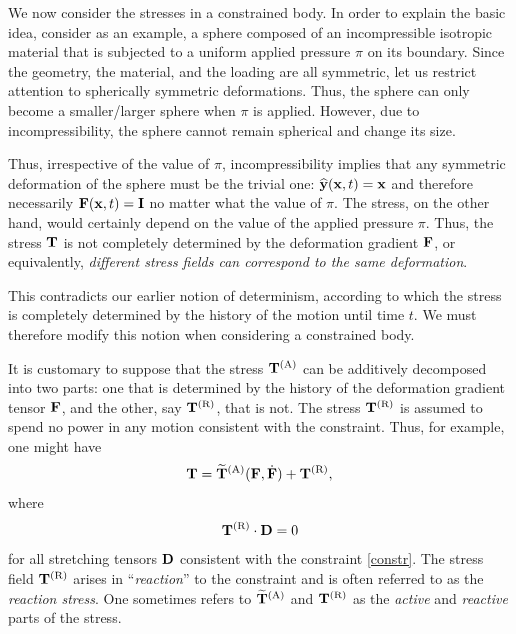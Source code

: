 We now consider the stresses in a constrained body. In order to explain the basic idea, consider as an example, a sphere composed of an incompressible isotropic material that is subjected to a uniform applied pressure $\pi$ on its boundary. Since the geometry, the material, and the loading are all symmetric, let us restrict attention to spherically symmetric deformations. Thus, the sphere can only become a smaller/larger sphere when $\pi$ is applied. However, due to incompressibility, the sphere cannot remain spherical and change its size.

Thus, irrespective of the value of $\pi$, incompressibility implies that any symmetric deformation of the sphere must be the trivial one: $\widehat{\mathbf{y}}(\mathbf{x}, t) = \mathbf{x}$ and therefore necessarily $\mathbf{F}(\mathbf{x}, t) = \mathbf{I}$ no matter what the value of $\pi$. The stress, on the other hand, would certainly depend on the value of the applied pressure $\pi$. Thus, the stress $\mathbf{T}$ is not completely determined by the deformation gradient $\mathbf{F}$, or equivalently,\textit{ different stress fields can correspond to the same deformation}. 

This contradicts our earlier notion of determinism, according to which the stress is completely determined by the history of the motion until time $t$. We must therefore modify this notion when considering a constrained body.

It is customary to suppose that the stress $\mathbf{T}^{(\rm A)}$ can be additively decomposed into two parts: one that is determined by the history of the deformation gradient tensor $\mathbf{F}$, and the other, say $\mathbf{T}^{(\rm R)}$, that is not. The stress $\mathbf{T}^{(\rm R)}$ is assumed to spend no power in any motion consistent with the constraint. Thus, for example, one might have
	\begin{equation}\label{Tar}
	\mathbf{T} = \widetilde{\mathbf{T}}^{(\rm A)}(\mathbf{F}, \dot{\mathbf{F}}) + \mathbf{T}^{(\rm R)},
\end{equation}
where
\begin{equation}\label{recpow}
	 \mathbf{T}^{(\rm R)} \cdot \mathbf{D} = 0 
\end{equation}
for all stretching tensors $\mathbf{D}$ consistent with the constraint \eqref{constr}. The stress field $\mathbf{T}^{(\rm R)}$ arises in ``\textit{reaction}'' to the constraint and is often referred to as the \textit{reaction stress}. One sometimes refers to $ \widetilde{\mathbf{T}}^{(\rm A)}$ and $ \mathbf{T}^{(\rm R)}$ as the \textit{active} and \textit{reactive} parts of the stress.

